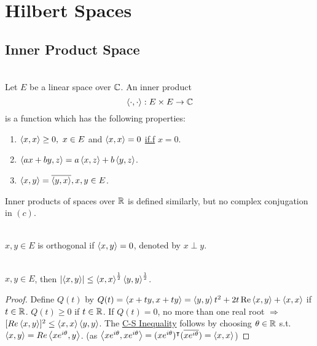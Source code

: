 \section{Hilbert Spaces}
\subsection{Inner Product Space}
\begin{definition}\ \\
Let $E$ be a linear space over $\mathbb{C}$. An inner product 
\begin{equation*}
\left\langle \cdot, \cdot \right\rangle: E \times E \to \mathbb{C}     
\end{equation*}
is a function which has the following properties:
\begin{enumerate}[label = (\alph*)]
    \item $\left\langle x, x \right\rangle \geq 0,\ x \in E$ and $\left\langle x, x \right\rangle = 0$ \underline{if.f} $x = 0$.
    \item $\left\langle ax + by, z \right\rangle = a\left\langle x, z \right\rangle + b \left\langle y, z \right\rangle$.
    \item $\left\langle x, y \right\rangle = \overline{\left\langle y, x \right\rangle}, x,y \in E$.
\end{enumerate}
\end{definition}
\begin{remark}
    Inner products of spaces over $\mathbb{R}$ is defined similarly, but no complex conjugation in $(c)$.
\end{remark}
\begin{definition}[Orthogonality]\ \\
$x,y \in E$ is orthogonal if $\left\langle x, y \right\rangle = 0$, denoted by $x \perp y$.
\end{definition}

\begin{theorem}\ \\
$x,y \in E$, then $\abs{\left\langle x, y \right\rangle} \leq \left\langle x, x \right\rangle^{\frac{1}{2}} \left\langle y, y \right\rangle^{\frac{1}{2}}$.
\end{theorem}
\begin{proof}
Define $Q(t)$ by $Q(t) = \left\langle x + ty, x + ty \right\rangle = \left\langle y, y \right\rangle t^2 + 2t \Re \left\langle x, y \right\rangle + \left\langle x, x \right\rangle$ if $t \in \mathbb{R}$. $Q(t) \geq 0$ if $t \in \mathbb{R}$. If $Q(t) = 0$, no more than one real root $\Rightarrow$ $[Re\left\langle x, y \right\rangle]^2 \leq \left\langle x, x \right\rangle \left\langle y, y \right\rangle$. The \underline{C-S Inequality} follows by choosing $\theta \in \mathbb{R}$ s.t. $\left\langle x, y \right\rangle = Re\left\langle x e^{i \theta}, y \right\rangle$. (as $\left\langle x e^{i \theta}, x e^{i \theta} \right\rangle = (x e^{i\theta})^\intercal (\overline{x e^{i\theta}}) = \left\langle x, x \right\rangle$)
\end{proof}


